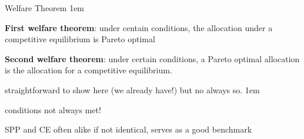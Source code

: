 \documentclass[11pt,aspectratio=43]{beamer}
\let\olditemize=\itemize
\let\endolditemize=\enditemize
\renewenvironment{itemize}{\olditemize \itemsep1em}{\endolditemize}
\theoremstyle{definition}
\begin{document}
\begin{frame}{Welfare Theorem}
\label{slide:Welfare_Theorem}
    \begin{itemize}
        \item \textbf{First welfare theorem}: under centain conditions, the allocation under a competitive equilibrium is Pareto optimal
        \item \textbf{Second welfare theorem}: under certain conditions, a Pareto optimal allocation is the allocation for a competitive equilibrium.
        \item straightforward to show here (we already have!) but no always so.
        \begin{itemize}
            \item conditions not always met!
        \end{itemize}
        \item SPP and CE often alike if not identical, serves as a good benchmark
    \end{itemize}
\end{frame}
\end{document}
